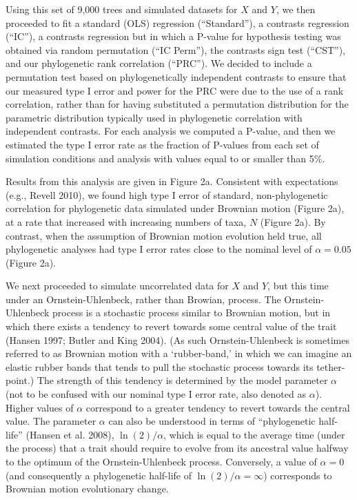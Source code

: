 \documentclass[fleqn,10pt,lineno]{wlpeerj} %
\begin{document}
Using this set of 9,000 trees and simulated datasets for \(X\) and \(Y\), we then proceeded to fit a standard (OLS) regression (``Standard''), a contrasts regression (``IC''), a contrasts regression but in which a P-value for hypothesis testing was obtained via random permutation (``IC Perm''), the contrasts sign test (``CST''), and our phylogenetic rank correlation (``PRC''). We decided to include a permutation test based on phylogenetically independent contrasts to ensure that our measured type I error and power for the PRC were due to the use of a rank correlation, rather than for having substituted a permutation distribution for the parametric distribution typically used in phylogenetic correlation with independent contrasts. For each analysis we computed a P-value, and then we estimated the type I error rate as the fraction of P-values from each set of simulation conditions and analysis with values equal to or smaller than 5\%.

Results from this analysis are given in Figure 2a. Consistent with expectations (e.g., Revell 2010), we found high type I error of standard, non-phylogenetic correlation for phylogenetic data simulated under Brownian motion (Figure 2a), at a rate that increased with increasing numbers of taxa, \(N\) (Figure 2a). By contrast, when the assumption of Brownian motion evolution held true, all phylogenetic analyses had type I error rates close to the nominal level of \(\alpha = 0.05\) (Figure 2a).

We next proceeded to simulate uncorrelated data for \(X\) and \(Y\), but this time under an Ornstein-Uhlenbeck, rather than Browian, process. The Ornstein-Uhlenbeck process is a stochastic process similar to Brownian motion, but in which there exists a tendency to revert towards some central value of the trait (Hansen 1997; Butler and King 2004). (As such Ornstein-Uhlenbeck is sometimes referred to as Brownian motion with a `rubber-band,' in which we can imagine an elastic rubber bands that tends to pull the stochastic process towards its tether-point.) The strength of this tendency is determined by the model parameter \(\alpha\) (not to be confused with our nominal type I error rate, also denoted as \(\alpha\)). Higher values of \(\alpha\) correspond to a greater tendency to revert towards the central value. The parameter \(\alpha\) can also be understood in terms of ``phylogenetic half-life'' (Hansen et al. 2008), \(\ln(2)/\alpha\), which is equal to the average time (under the process) that a trait should require to evolve from its ancestral value halfway to the optimum of the Ornstein-Uhlenbeck process. Conversely, a value of \(\alpha = 0\) (and consequently a phylogenetic half-life of \(\ln(2)/\alpha = \infty\)) corresponds to Brownian motion evolutionary change.
\end{document}
